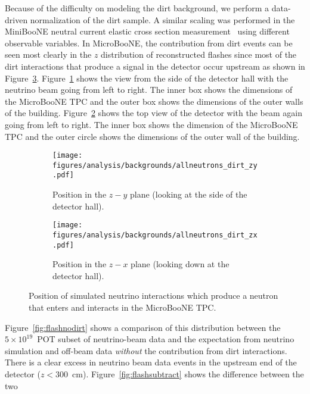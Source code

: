     Because of the difficulty on modeling the dirt background, we perform a
    data-driven normalization of the dirt sample. A similar scaling was
    performed in the MiniBooNE neutral current elastic cross section
    measurement~\cite{Aguilar-Arevalo:2010cx} using different observable
    variables. In MicroBooNE, the contribution from dirt events can be seen
    most clearly in the $z$ distribution of reconstructed flashes since most of
    the dirt interactions that produce a signal in the detector occur upstream
    as shown in Figure~\ref{fig:dirtneutronpos}. Figure~\ref{fig:dirtnzy} shows
    the view from the side of the detector hall with the neutrino beam going
    from left to right. The inner box shows the dimensions of the MicroBooNE
    TPC and the outer box shows the dimensions of the outer walls of the
    building.  Figure~\ref{fig:dirtnzx} shows the top view of the detector with
    the beam again going from left to right. The inner box shows the dimension
    of the MicroBooNE TPC and the outer circle shows the dimensions of the
    outer wall of the building.
    \begin{figure}[h]
      \centering
      \begin{subfigure}[t]{2.8in}
        \texttt{[image: figures/analysis/backgrounds/allneutrons\_dirt\_zy.pdf]}
        \caption{Position in the $z-y$ plane (looking at the side of the detector hall).}
        \label{fig:dirtnzy}
      \end{subfigure}
      \hspace{2pt}
      \begin{subfigure}[t]{2.8in}
        \texttt{[image: figures/analysis/backgrounds/allneutrons\_dirt\_zx.pdf]}
        \caption{Position in the $z-x$ plane (looking down at the detector hall).}
        \label{fig:dirtnzx}
      \end{subfigure}
      \caption{Position of simulated neutrino interactions which produce a
      neutron that enters and interacts in the MicroBooNE TPC.}
      \label{fig:dirtneutronpos}
    \end{figure}
    Figure~\ref{fig:flashnodirt} shows a comparison of this distribution
    between the $5\times 10^{19}$~POT subset of neutrino-beam data and the expectation from
    neutrino simulation and off-beam data \textit{without} the contribution
    from dirt interactions. There is a clear excess in neutrino beam data
    events in the upstream end of the detector ($z < 300$~cm).
    Figure~\ref{fig:flashsubtract} shows the difference between the two
